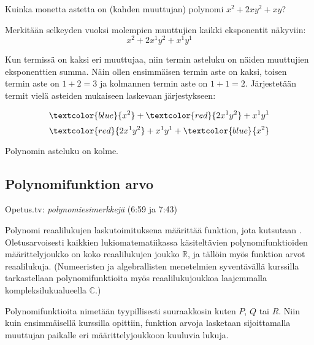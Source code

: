 \begin{esimerkki}
	Kuinka monetta astetta on (kahden muuttujan) polynomi $x^2+2xy^2+xy$?
\begin{esimratk}
Merkitään selkeyden vuoksi molempien muuttujien kaikki eksponentit näkyviin: \\
\[x^2+2x^1y^2+x^1y^1\]

Kun termissä on kaksi eri muuttujaa, niin termin asteluku on näiden muuttujien eksponenttien summa. Näin ollen ensimmäisen termin aste on kaksi, toisen termin aste on $1+2=3$ ja kolmannen termin aste on $1+1=2$. Järjestetään termit vielä asteiden mukaiseen laskevaan järjestykseen:

\[\textcolor{blue}{x^2}+\textcolor{red}{2x^1y^2}+x^1y^1\]
\[\textcolor{red}{2x^1y^2}+x^1y^1+\textcolor{blue}{x^2}\]

\end{esimratk} 

\begin{esimvast}
Polynomin asteluku on kolme.
\end{esimvast}

\end{esimerkki}

\subsection*{Polynomifunktion arvo}

{Opetus.tv: \emph{polynomiesimerkkejä} (6:59 ja 7:43)}

Polynomi reaalilukujen laskutoimituksena määrittää funktion, jota kutsutaan . Oletusarvoisesti kaikkien lukiomatematiikassa käsiteltävien polynomifunktioiden määrittelyjoukko on koko reaalilukujen joukko $\mathbb{R}$, ja tällöin myös funktion arvot reaalilukuja. (Numeeristen ja algebrallisten menetelmien syventävällä kurssilla tarkastellaan polynomifunktioita myös reaalilukujoukkoa laajemmalla kompleksilukualueella $\mathbb{C}$.)


Polynomifunktioita nimetään tyypillisesti suuraakkosin kuten $P$, $Q$ tai $R$. Niin kuin ensimmäisellä kurssilla opittiin, funktion arvoja lasketaan sijoittamalla muuttujan paikalle eri määrittelyjoukkoon kuuluvia lukuja.


